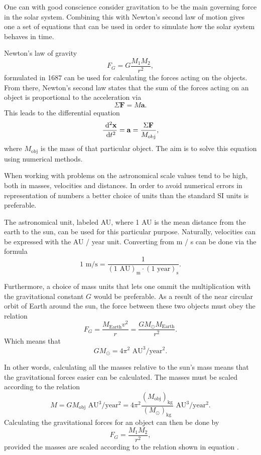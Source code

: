 One can with good conscience consider gravitation to be the main
governing force in the solar system. Combining this with Newton's
second law of motion gives one a set of equations that can be used
in order to simulate how the solar system behaves in time.

Newton's law of gravity \[ F_G = G\frac{M_1 M_2}{r^2}, \]
formulated in 1687 can be used for calculating the forces acting on
the objects. From there, Newton's second law states that the sum of
the forces acting on an object is proportional to the acceleration
via \[ \Sigma \mathbf{F} = M \mathbf{a}. \] This leads to the
differential equation
\begin{equation}
    \label{eq:newtonDifferential}
    \frac{\ \mathrm{d}^2 \mathbf{x}}{\ \mathrm{d}t^2} = \mathbf{a} = \frac{\Sigma
        \mathbf{F}}{M_{\text{obj}}},
\end{equation}
where $M_{\text{obj}}$ is the mass of that particular object. The
aim is to solve this equation using numerical methods.

When working with problems on the astronomical scale values tend to
be high, both in masses, velocities and distances. In order to
avoid numerical errors in representation of numbers a better choice
of units than the standard SI units is preferable.

The astronomical unit, labeled AU, where 1 AU is the mean distance
from the earth to the sun, can be used for this particular purpose.
Naturally, velocities can be expressed with the AU / year unit.
Converting from m / s can be done via the formula \[1 \text{ m/s} =
\frac{1}{(1 \text{ AU})_{\text{m}} \cdot (1 \text{ year})_{\text{s}}}. \]

Furthermore, a choice of mass units that lets one ommit the
multiplication with the gravitational constant $G$ would be
preferable. As a result of the near circular orbit of Earth around
the sun, the force between these two objects must obey the relation
\[ F_G = \frac{M_{\text{Earth}}v^2}{r} = \frac{G M_{\odot}
M_{\text{Earth}}}{r^2}. \] Which means that \[G M_{\odot} = 4\pi^2
\text{ AU}^3 / \text{year}^2. \]

In other words, calculating all the masses relative to the sun's
mass means that the gravitational forces easier can be calculated.
The masses must be scaled according to the relation
\begin{equation} 
    \label{eq:scaleMass}
    M = G M_{\text{obj}} \text{ AU}^3 / \text{year}^2 = 4\pi^2
    \frac{(M_{\text{obj}})_{\text{kg}}}{(M_{\odot})_{\text{kg}}}
    \text{ AU}^3 / \text{year}^2.
\end{equation}
Calculating the gravitational forces for an object can then be done
by \[ F_G = \frac{M_1 M_2}{r^2}, \] provided the masses are scaled
according to the relation shown in equation .

